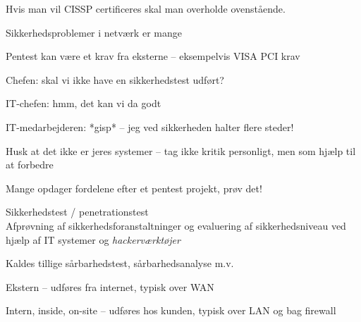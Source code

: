 \documentclass[20pt,landscape,a4paper,footrule]{foils}
\begin{document}
Hvis man vil CISSP certificeres skal man overholde ovenstående.\\



\begin{list1}
\item Sikkerhedsproblemer i netværk er mange
\item Pentest kan være et krav fra eksterne -- eksempelvis VISA PCI krav
\end{list1}

\begin{list2}
\item Chefen: skal vi ikke have en sikkerhedstest udført?
\item IT-chefen: hmm, det kan vi da godt
\item IT-medarbejderen: *gisp* -- jeg ved sikkerheden halter flere steder!
\item Husk at det ikke er jeres systemer -- tag ikke kritik personligt,
men som hjælp til at forbedre
\end{list2}

\vskip 2cm
\centerline{Mange opdager fordelene efter et pentest projekt, prøv det!}



\begin{list1}
\item Sikkerhedstest / penetrationstest\\
Afprøvning af sikkerhedsforanstaltninger og evaluering af
sikkerhedsniveau ved hjælp af IT systemer og \emph{hackerværktøjer}
\item Kaldes tillige sårbarhedstest, sårbarhedsanalyse m.v.
\item Ekstern -- udføres fra internet, typisk over WAN
\item Intern, inside, on-site -- udføres hos kunden, typisk over LAN og
  bag firewall
\end{list1}


\end{document}
